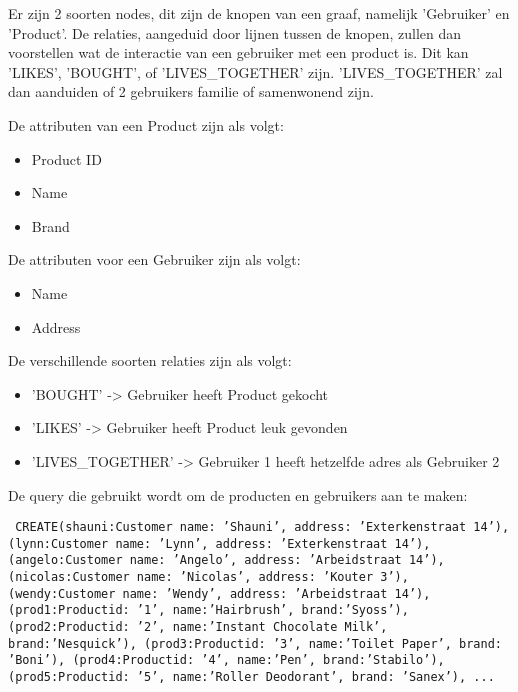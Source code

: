 Er zijn 2 soorten nodes, dit zijn de knopen van een graaf, namelijk 'Gebruiker' en 'Product'. De relaties, aangeduid door lijnen tussen de knopen, zullen dan voorstellen wat de interactie van een gebruiker met een product is. Dit kan 'LIKES', 'BOUGHT', of 'LIVES\_TOGETHER' zijn. 'LIVES\_TOGETHER' zal dan aanduiden of 2 gebruikers familie of samenwonend zijn. 

De attributen van een Product zijn als volgt:
\begin{itemize}
	\item Product ID
	\item Name
	\item Brand
\end{itemize}

De attributen voor een Gebruiker zijn als volgt:
\begin{itemize}
	\item Name
	\item Address
\end{itemize}

De verschillende soorten relaties zijn als volgt:
\begin{itemize}
	\item 'BOUGHT' -> Gebruiker heeft Product gekocht
	\item 'LIKES' -> Gebruiker heeft Product leuk gevonden
	\item 'LIVES\_TOGETHER' -> Gebruiker 1 heeft hetzelfde adres als Gebruiker 2
\end{itemize}

De query die gebruikt wordt om de producten en gebruikers aan te maken:

\texttt{
CREATE(shauni:Customer {name: 'Shauni', address: 'Exterkenstraat 14'}), \newline
(lynn:Customer {name: 'Lynn', address: 'Exterkenstraat 14'}), \newline
(angelo:Customer {name: 'Angelo', address: 'Arbeidstraat 14'}), \newline
(nicolas:Customer {name: 'Nicolas', address: 'Kouter 3'}), \newline
(wendy:Customer {name: 'Wendy', address: 'Arbeidstraat 14'}), \newline
(prod1:Product{id: '1', name:'Hairbrush', brand:'Syoss'}), \newline
(prod2:Product{id: '2', name:'Instant Chocolate Milk', brand:'Nesquick'}), \newline
(prod3:Product{id: '3', name:'Toilet Paper', brand: 'Boni'}), \newline
(prod4:Product{id: '4', name:'Pen', brand:'Stabilo'}), \newline
(prod5:Product{id: '5', name:'Roller Deodorant', brand: 'Sanex'}), \newline
...
}

